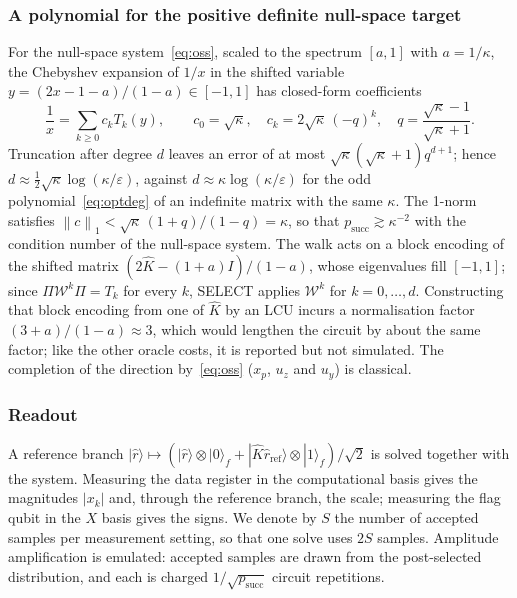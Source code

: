 \documentclass[11pt]{article}
\theoremstyle{definition}
\newcommand{\norm}[1]{\left\lVert #1 \right\rVert}
\newcommand{\Kh}{\hat K}
\newcommand{\eps}{\varepsilon}
\begin{document}
\subsubsection{A polynomial for the positive definite null-space target}\label{sec:qspd}
For the null-space system~\eqref{eq:oss}, scaled to the spectrum $[a,1]$ with $a=1/\kappa$, the Chebyshev expansion of $1/x$ in the shifted variable $y=(2x-1-a)/(1-a)\in[-1,1]$ has closed-form coefficients
\begin{equation}\label{eq:spdpoly}
\frac1x=\sum_{k\ge0}c_kT_k(y),\qquad c_0=\sqrt\kappa,\quad c_k=2\sqrt\kappa\,(-q)^k,\quad q=\frac{\sqrt\kappa-1}{\sqrt\kappa+1}.
\end{equation}
Truncation after degree $d$ leaves an error of at most $\sqrt\kappa(\sqrt\kappa+1)q^{d+1}$; hence $d\approx\tfrac12\sqrt\kappa\log(\kappa/\eps)$, against $d\approx\kappa\log(\kappa/\eps)$ for the odd polynomial~\eqref{eq:optdeg} of an indefinite matrix with the same $\kappa$. The 1-norm satisfies $\norm{c}_1<\sqrt\kappa\,(1+q)/(1-q)=\kappa$, so that $p_{\text{succ}}\gtrsim\kappa^{-2}$ with the condition number of the null-space system. The walk acts on a block encoding of the shifted matrix $(2\Kh-(1+a)I)/(1-a)$, whose eigenvalues fill $[-1,1]$; since $\Pi\mathcal W^k\Pi=T_k$ for every $k$, SELECT applies $\mathcal W^k$ for $k=0,\dots,d$. Constructing that block encoding from one of $\Kh$ by an LCU incurs a normalisation factor $(3+a)/(1-a)\approx3$, which would lengthen the circuit by about the same factor; like the other oracle costs, it is reported but not simulated. The completion of the direction by~\eqref{eq:oss} ($x_p$, $u_z$ and $u_y$) is classical.

\subsubsection{Readout}\label{sec:readout}
A reference branch $|\hat r\rangle\mapsto(|\hat r\rangle\otimes|0\rangle_f+|\Kh\hat r_{\text{ref}}\rangle\otimes|1\rangle_f)/\sqrt2$ is solved together with the system. Measuring the data register in the computational basis gives the magnitudes $|x_k|$ and, through the reference branch, the scale; measuring the flag qubit in the $X$ basis gives the signs. We denote by $S$ the number of accepted samples per measurement setting, so that one solve uses $2S$ samples. Amplitude amplification is emulated: accepted samples are drawn from the post-selected distribution, and each is charged $1/\sqrt{p_{\text{succ}}}$ circuit repetitions.
\end{document}
